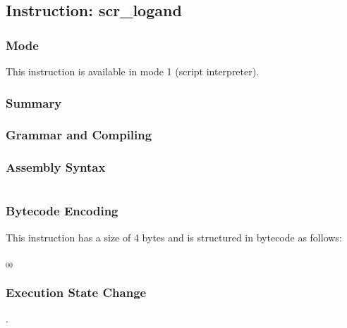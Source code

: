 \subsection{Instruction: scr\_logand}

\subsubsection{Mode}
This instruction is available in mode 1 (script interpreter).
\subsubsection{Summary}


\subsubsection{Grammar and Compiling}


\subsubsection{Assembly Syntax}

\begin{myquote}
\begin{verbatim}

\end{verbatim}
\end{myquote}

\subsubsection{Bytecode Encoding}

This instruction has a size of 4 bytes and is structured in bytecode as follows:

$_{00}$\ 

\subsubsection{Execution State Change}

.


